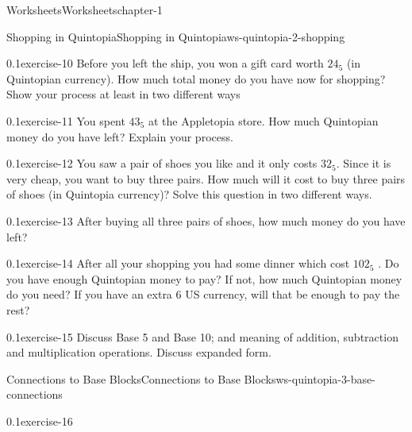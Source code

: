 \documentclass[twoside,11pt,]{book}
\begin{document}
\begin{chapterptx}{Worksheets}{}{Worksheets}{}{}{chapter-1}
\begin{worksheet-section-numberless}{Shopping in Quintopia}{}{Shopping in Quintopia}{}{}{ws-quintopia-2-shopping}
\begin{divisionexercise}{1}{}{0.1}{exercise-10}%
\hypertarget{p-25}{}%
Before you left the ship, you won a gift card worth \(24_{5}\) (in Quintopian currency). How much total money do you have now for shopping? Show your process at least in two different ways%
\end{divisionexercise}%
\begin{divisionexercise}{2}{}{0.1}{exercise-11}%
\hypertarget{p-26}{}%
You spent \(43_{5}\) at the Appletopia store. How much Quintopian money do you have left?  Explain your process.%
\end{divisionexercise}%
\begin{divisionexercise}{3}{}{0.1}{exercise-12}%
\hypertarget{p-27}{}%
You saw a pair of shoes you like and it only costs \(32_{5}\). Since it is very cheap, you want to buy three pairs. How much will it cost to buy three pairs of shoes (in Quintopia currency)? Solve this question in two different ways.%
\end{divisionexercise}%
\clearpage
\begin{divisionexercise}{4}{}{0.1}{exercise-13}%
\hypertarget{p-28}{}%
After buying all three pairs of shoes, how much money do you have left?%
\end{divisionexercise}%
\begin{divisionexercise}{5}{}{0.1}{exercise-14}%
\hypertarget{p-29}{}%
After all your shopping you had some dinner which cost \(102_{5}\) . Do you have enough Quintopian money to pay? If not, how much Quintopian money do you need?  If you have an extra \textdollar{}6 US currency, will that be enough to pay the rest?%
\end{divisionexercise}%
\begin{divisionexercise}{6}{}{0.1}{exercise-15}%
\hypertarget{p-30}{}%
Discuss Base 5 and Base 10; and meaning of addition, subtraction and multiplication operations. Discuss expanded form.%
\end{divisionexercise}%
\end{worksheet-section-numberless}
\restoregeometry
%
%
\typeout{************************************************}
\typeout{************************************************}
%
\begin{worksheet-section-numberless}{Connections to Base Blocks}{}{Connections to Base Blocks}{}{}{ws-quintopia-3-base-connections}
\begin{divisionexercise}{1}{}{0.1}{exercise-16}%

\end{divisionexercise}
\end{worksheet-section-numberless}
\end{chapterptx}
\end{document}
